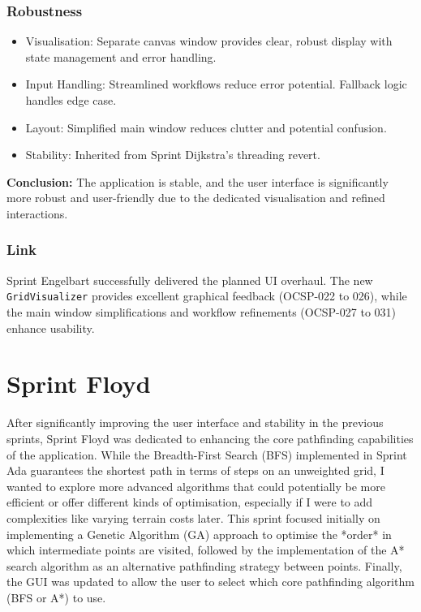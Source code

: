 \subsubsection{Robustness}
\begin{itemize}
	\item Visualisation: Separate canvas window provides clear, robust display with state management and error handling.
	\item Input Handling: Streamlined workflows reduce error potential. Fallback logic handles edge case.
	\item Layout: Simplified main window reduces clutter and potential confusion.
	\item Stability: Inherited from Sprint Dijkstra's threading revert.
\end{itemize}
\textbf{Conclusion:} The application is stable, and the user interface is significantly more robust and user-friendly due to the dedicated visualisation and refined interactions.

\subsubsection{Link}
Sprint Engelbart successfully delivered the planned UI overhaul. The new \verb|GridVisualizer| provides excellent graphical feedback (OCSP-022 to 026), while the main window simplifications and workflow refinements (OCSP-027 to 031) enhance usability.

\newpage


\section{Sprint Floyd}

After significantly improving the user interface and stability in the previous sprints, Sprint Floyd was dedicated to enhancing the core pathfinding capabilities of the application. While the Breadth-First Search (BFS) implemented in Sprint Ada guarantees the shortest path in terms of steps on an unweighted grid, I wanted to explore more advanced algorithms that could potentially be more efficient or offer different kinds of optimisation, especially if I were to add complexities like varying terrain costs later. This sprint focused initially on implementing a Genetic Algorithm (GA) approach to optimise the *order* in which intermediate points are visited, followed by the implementation of the A* search algorithm as an alternative pathfinding strategy between points. Finally, the GUI was updated to allow the user to select which core pathfinding algorithm (BFS or A*) to use.

